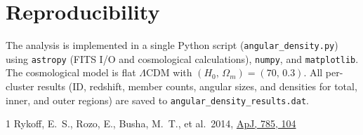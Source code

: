 \documentclass[12pt, letterpaper]{article}
\begin{document}
\section{Reproducibility}
\label{sec:reproducibility}

The analysis is implemented in a single Python script
(\texttt{angular\_density.py}) using \texttt{astropy} (FITS I/O and
cosmological calculations), \texttt{numpy}, and \texttt{matplotlib}.
The cosmological model is flat $\Lambda$CDM with
$(H_0,\,\Omega_m) = (70,\, 0.3)$.  All per-cluster results (ID,
redshift, member counts, angular sizes, and densities for total, inner,
and outer regions) are saved to \texttt{angular\_density\_results.dat}.


\begin{thebibliography}{1}
Rykoff, E.~S., Rozo, E., Busha, M.~T., et al.\ 2014,
\href{https://doi.org/10.1088/0004-637X/785/2/104}{ApJ, 785, 104}
\end{thebibliography}
\end{document}
